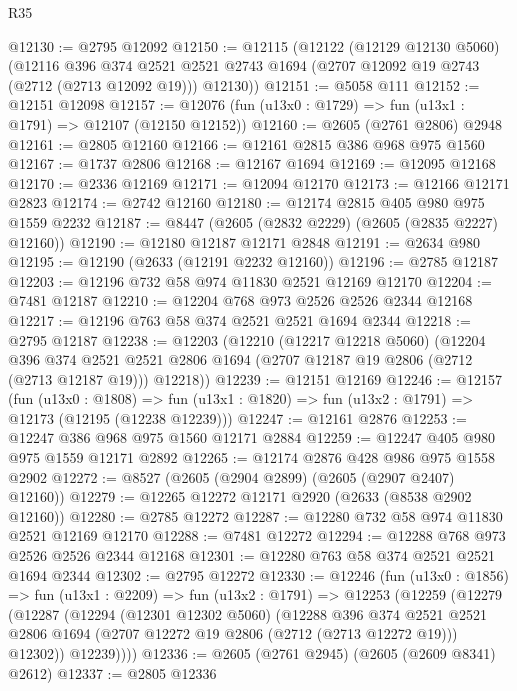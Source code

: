 \begin{lexlean}{R35}
\begin{coremodule}
@12130 := @2795 @12092
@12150 := @12115
    (@12122
      (@12129 @12130 @5060)
      (@12116
        @396
        @374
        @2521
        @2521
        @2743
        @1694
        (@2707 @12092 @19 @2743 (@2712 (@2713 @12092 @19)))
        @12130))
@12151 := @5058 @111
@12152 := @12151 @12098
@12157 := @12076 (fun (u13x0 : @1729) => fun (u13x1 : @1791) => @12107 (@12150 @12152))
@12160 := @2605 (@2761 @2806) @2948
@12161 := @2805 @12160
@12166 := @12161 @2815 @386 @968 @975 @1560
@12167 := @1737 @2806
@12168 := @12167 @1694
@12169 := @12095 @12168
@12170 := @2336 @12169
@12171 := @12094 @12170
@12173 := @12166 @12171 @2823
@12174 := @2742 @12160
@12180 := @12174 @2815 @405 @980 @975 @1559 @2232
@12187 := @8447 (@2605 (@2832 @2229) (@2605 (@2835 @2227) @12160))
@12190 := @12180 @12187 @12171 @2848
@12191 := @2634 @980
@12195 := @12190 (@2633 (@12191 @2232 @12160))
@12196 := @2785 @12187
@12203 := @12196 @732 @58 @974 @11830 @2521 @12169 @12170
@12204 := @7481 @12187
@12210 := @12204 @768 @973 @2526 @2526 @2344 @12168
@12217 := @12196 @763 @58 @374 @2521 @2521 @1694 @2344
@12218 := @2795 @12187
@12238 := @12203
    (@12210
      (@12217 @12218 @5060)
      (@12204
        @396
        @374
        @2521
        @2521
        @2806
        @1694
        (@2707 @12187 @19 @2806 (@2712 (@2713 @12187 @19)))
        @12218))
@12239 := @12151 @12169
@12246 := @12157
    (fun (u13x0 : @1808) =>
    fun (u13x1 : @1820) => fun (u13x2 : @1791) => @12173 (@12195 (@12238 @12239)))
@12247 := @12161 @2876
@12253 := @12247 @386 @968 @975 @1560 @12171 @2884
@12259 := @12247 @405 @980 @975 @1559 @12171 @2892
@12265 := @12174 @2876 @428 @986 @975 @1558 @2902
@12272 := @8527 (@2605 (@2904 @2899) (@2605 (@2907 @2407) @12160))
@12279 := @12265 @12272 @12171 @2920 (@2633 (@8538 @2902 @12160))
@12280 := @2785 @12272
@12287 := @12280 @732 @58 @974 @11830 @2521 @12169 @12170
@12288 := @7481 @12272
@12294 := @12288 @768 @973 @2526 @2526 @2344 @12168
@12301 := @12280 @763 @58 @374 @2521 @2521 @1694 @2344
@12302 := @2795 @12272
@12330 := @12246
    (fun (u13x0 : @1856) =>
    fun (u13x1 : @2209) =>
    fun (u13x2 : @1791) =>
    @12253
      (@12259
        (@12279
          (@12287
            (@12294
              (@12301 @12302 @5060)
              (@12288
                @396
                @374
                @2521
                @2521
                @2806
                @1694
                (@2707 @12272 @19 @2806 (@2712 (@2713 @12272 @19)))
                @12302))
            @12239))))
@12336 := @2605 (@2761 @2945) (@2605 (@2609 @8341) @2612)
@12337 := @2805 @12336

\end{coremodule}
\end{lexlean}
